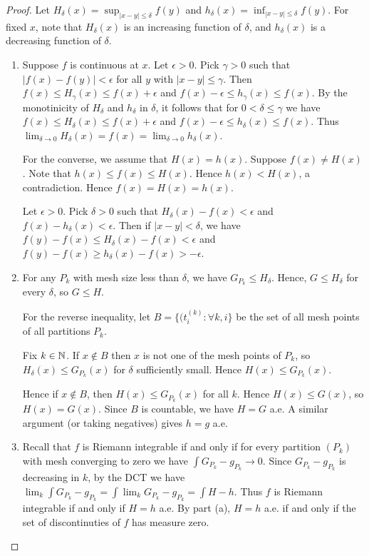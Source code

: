 \documentclass{article}
\begin{document}
\begin{proof}
Let $H_\delta(x) = \sup_{|x - y| \le \delta} f(y)$ and $h_\delta(x) = \inf_{|x - y| \le \delta} f(y)$. For fixed $x$, note that $H_\delta(x)$ is an increasing function of $\delta$, and $h_\delta(x)$ is a decreasing function of $\delta$.

\begin{enumerate}[\bfseries a)]

\item Suppose $f$ is continuous at $x$. Let $\epsilon > 0$. Pick $\gamma > 0$ such that $|f(x) - f(y)| < \epsilon$ for all $y$ with $|x - y| \le \gamma$.  Then $f(x) \le H_\gamma(x) \le f(x) + \epsilon$ and $f(x) - \epsilon \le h_\gamma(x) \le f(x)$.  By the monotinicity of $H_\delta$ and $h_\delta$ in $\delta$, it follows that for $0 < \delta \le  \gamma$ we have $f(x) \le H_\delta(x) \le f(x) + \epsilon$ and $f(x) - \epsilon \le h_\delta(x) \le f(x)$.  Thus $\lim_{\delta \to 0} H_\delta(x) = f(x) = \lim_{\delta \to 0} h_\delta(x)$.

For the converse, we assume that $H(x) = h(x)$.  Suppose $f(x) \neq H(x)$.  Note that $h(x) \le f(x) \le H(x)$.  Hence $h(x) < H(x)$, a contradiction.  Hence $f(x) = H(x) = h(x)$.  

Let $\epsilon > 0$.  Pick $\delta > 0$ such that $H_\delta(x) - f(x) < \epsilon$ and $f(x) - h_\delta(x) < \epsilon$. Then if $|x - y| < \delta$, we have $f(y) - f(x) \le H_\delta(x) - f(x) < \epsilon$ and $f(y) - f(x) \ge h_\delta(x) - f(x) > - \epsilon$.

\item For any  $P_k$ with mesh size less than $\delta$, we have $G_{P_k} \le H_\delta$. Hence, $G \le H_\delta$ for every $\delta$, so $G \le H$.  

For the reverse inequality, let $B = \{(t_i^{(k)} : \forall k, i\}$ be the set of all mesh points of all partitions $P_k$. 

Fix $k \in \mathbb{N}$. If $x \not \in B$ then $x$ is not one of the mesh points of $P_k$, so $H_\delta(x) \le G_{P_k}(x)$ for $\delta$ sufficiently small. Hence $H(x) \le G_{P_k}(x)$.  

Hence if $x \not \in B$, then $H(x) \le G_{P_k}(x)$ for all $k$.  Hence $H(x) \le G(x)$, so $H(x) = G(x)$.  Since $B$ is countable, we have $H = G$ a.e.  A similar argument (or taking negatives) gives $h = g$ a.e.

\item Recall that $f$ is Riemann integrable if and only if for every partition $(P_k)$ with mesh converging to zero we have $\int G_{P_k} - g_{P_k} \to 0$.  Since $G_{P_k} - g_{P_k}$ is decreasing in $k$, by the DCT we have $\lim_k \int G_{P_k} - g_{P_k} = \int \lim_k G_{P_k} - g_{P_k} = \int H - h$.  Thus $f$ is Riemann integrable if and only if $H = h$ a.e. By part (a), $H=h$ a.e. if and only if the set of discontinuties of $f$ has measure zero.
\end{enumerate}
\end{proof}
\end{document}
